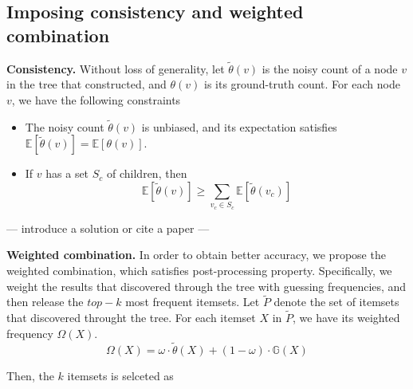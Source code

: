 \documentclass[conference]{IEEEtran}
\begin{document}


\subsection{Imposing consistency and weighted combination}
\label{optimize}
\textbf{Consistency.} Without loss of generality, let $\tilde{\theta}(v)$ is the noisy count of a node $v$ in the tree that constructed, and $\theta(v)$ is its ground-truth count. For each node $v$, we have the following constraints
\begin{itemize}
\item The noisy count $\tilde{\theta}(v)$ is unbiased, and its expectation satisfies $\mathbb{E}[\tilde{\theta}(v)] = \mathbb{E}[\theta(v)]$.
\item If $v$ has a set $S_c$ of children, then\\
$$\mathbb{E}[\tilde{\theta}(v)] \geq \sum_{v_c \in S_c} \mathbb{E}[\tilde{\theta}(v_c)]$$
\end{itemize} 

{\color{red}--- introduce a solution or cite a paper ---}

\textbf{Weighted combination.} In order to obtain better accuracy, we propose the weighted combination, which satisfies post-processing property. Specifically, we weight the results that discovered through the tree with guessing frequencies, and then release the $top-k$ most frequent itemsets. Let $\tilde{P}$ denote the set of itemsets that discovered throught the tree. For each itemset $X$ in $\tilde{P}$, we have its weighted frequency $\Omega (X)$.
\begin{equation}
\Omega (X) = \omega \cdot \tilde{\theta}(X) + (1-\omega)\cdot \mathbb{G}(X) \label{weighted frequency}
\end{equation}

Then, the $k$ itemsets is selceted as 


\end{document}
